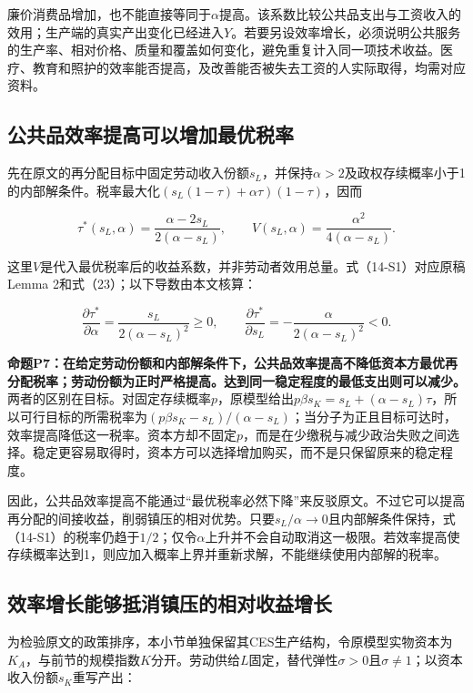 \documentclass[UTF8,fontset=windows,12pt,a4paper,oneside,openany]{ctexbook}
\begin{document}
廉价消费品增加，也不能直接等同于$\alpha$提高。该系数比较公共品支出与工资收入的效用；生产端的真实产出变化已经进入$Y$。若要另设效率增长，必须说明公共服务的生产率、相对价格、质量和覆盖如何变化，避免重复计入同一项技术收益。医疗、教育和照护的效率能否提高，及改善能否被失去工资的人实际取得，均需对应资料。

\subsection{公共品效率提高可以增加最优税率}

先在原文的再分配目标中固定劳动收入份额$s_L$，并保持$\alpha>2$及政权存续概率小于1的内部解条件。税率最大化$(s_L(1-\tau)+\alpha\tau)(1-\tau)$，因而

\[
\tau^*(s_L,\alpha)=\frac{\alpha-2s_L}{2(\alpha-s_L)},\qquad
V(s_L,\alpha)=\frac{\alpha^2}{4(\alpha-s_L)}.
\tag{14-S1}
\]

这里$V$是代入最优税率后的收益系数，并非劳动者效用总量。式（14-S1）对应原稿Lemma 2和式（23）；以下导数由本文核算：

\[
\frac{\partial\tau^*}{\partial\alpha}
=\frac{s_L}{2(\alpha-s_L)^2}\geq0,\qquad
\frac{\partial\tau^*}{\partial s_L}
=-\frac{\alpha}{2(\alpha-s_L)^2}<0.
\tag{14-S2}
\]

\textbf{命题P7：在给定劳动份额和内部解条件下，公共品效率提高不降低资本方最优再分配税率；劳动份额为正时严格提高。达到同一稳定程度的最低支出则可以减少。} 两者的区别在目标。对固定存续概率$p$，原模型给出$p\beta s_K=s_L+(\alpha-s_L)\tau$，所以可行目标的所需税率为$(p\beta s_K-s_L)/(\alpha-s_L)$；当分子为正且目标可达时，效率提高降低这一税率。资本方却不固定$p$，而是在少缴税与减少政治失败之间选择。稳定更容易取得时，资本方可以选择增加购买，而不是只保留原来的稳定程度。

因此，公共品效率提高不能通过“最优税率必然下降”来反驳原文。不过它可以提高再分配的间接收益，削弱镇压的相对优势。只要$s_L/\alpha\to0$且内部解条件保持，式（14-S1）的税率仍趋于$1/2$；仅令$\alpha$上升并不会自动取消这一极限。若效率提高使存续概率达到1，则应加入概率上界并重新求解，不能继续使用内部解的税率。

\subsection{效率增长能够抵消镇压的相对收益增长}

为检验原文的政策排序，本小节单独保留其CES生产结构，令原模型实物资本为$K_A$，与前节的规模指数$K$分开。劳动供给$L$固定，替代弹性$\sigma>0$且$\sigma\ne1$；以资本收入份额$s_K$重写产出：
\end{document}
